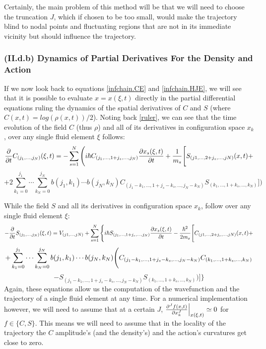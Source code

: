 \documentclass[11pt, a4paper]{article} %
\begin{document}
Certainly, the main problem of this method will be that we will need to choose the truncation $J$, which if chosen to be too small, would make the trajectory blind to nodal points and fluctuating regions that are not in its immediate vicinity but should influence the trajectory.\vspace{-0.1cm}

\subsubsection*{(II.d.b) Dynamics of Partial Derivatives For the Density and Action}\vspace{-0.1cm}

If we now look back to equations \eqref{infchain.CE} and \eqref{infchain.HJE}, we will see that it is possible to evaluate $x=x(\xi,t)$ directly in the partial differential equations ruling the dynamics of the spatial derivatives of $C$ and $S$ (where $C(x,t)=log(\rho(x,t))/2$). Noting back \eqref{ruler}, we can see that the time evolution of the field $C$ (thus $\rho$) and all of its derivatives in configuration space $x_k$, over any single fluid element $\xi$ follows:\vspace{-0.1cm}
\begin{equation}\label{infchain.CE.L}
\pdv{}{t}C_{(j_1,...,j_N)}(\xi,t)=-\sum_{s=1}^N \Bigg(i\hbar C_{(j_1,...,1+j_s,...,j_N)}\pdv{x_s(\xi,t)}{t} + \frac{1}{m_s} \Bigg[S_{(j1,...,2+j_s,...,jN)}(x,t)+
\end{equation}
$$
+2 \sum_{k_1=0}^{j_1}\cdots\sum_{k_N=0}^{j_N} b(j_1,k_1)\cdots b(j_N,k_N)C_{(j_1-k_1,...,1+j_s-k_s,...,j_N-k_N)}S_{(k_1,...,1+k_s,...,k_N)} \Bigg]\bigg)
$$

While the field $S$ and all its derivatives in configuration space $x_k$, follow over any single fluid element $\xi$:\vspace{-0.1cm}
\begin{equation}\label{infchain.HJE.L}
-\pdv{}{t}S_{(j_1,...,j_N)}(\xi,t)=V_{(j1,...,jN)}+\sum_{s=1}^N\Bigg\{ i\hbar S_{(j_1,...,1+j_s,...,j_N)}\pdv{x_s(\xi,t)}{t}-\frac{\hbar^2}{2m_s} \Bigg[ C_{(j1,...,2+j_s,...,jN)}(x,t)+\vspace{-0.1cm}
\end{equation}
$$
+\sum_{k_1=0}^{j_1}\cdots\sum_{k_N=0}^{j_N} b(j_1,k_1)\cdots b(j_N,k_N) \Bigg( C_{(j_1-k_1,...,1+j_s-k_s,...,j_N-k_N)}C_{(k_1,...,1+k_s,...,k_N)} \vspace{-0.1cm}
$$
$$
-S_{(j_1-k_1,...,1+j_s-k_s,...,j_N-k_N)}S_{(k_1,...,1+k_s,...,k_N)}  \Bigg)\Bigg]\Bigg\}
$$
Again, these equations allow us the computation of the wavefunction and the trajectory of a single fluid element at any time. For a numerical implementation however, we will need to assume that at a certain $J$, $\pdv[J]{f(x,t)}{x_k}\Big\rvert_{x(\xi,t)}\simeq 0$ for $f\in\{ C,S\}$. This means we will need to assume that in the locality of the trajectory the $C$ amplitude's (and the density's) and the action's curvatures get close to zero.\\
\end{document}
